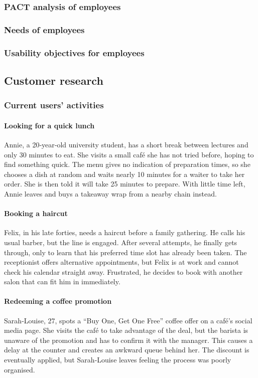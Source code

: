 \documentclass[]{VUMIFTemplateClass}
\newcommand{\subsubsubsection}[1]{\paragraph{#1}}
\begin{document}
\subsubsection{PACT analysis of employees}

\subsubsection{Needs of employees}

\subsubsection{Usability objectives for employees}

\subsection{Customer research}

\subsubsection{Current users' activities}

\subsubsubsection{Looking for a quick lunch}


Annie, a 20‑year‑old university student, has a short break between lectures and
only 30 minutes to eat. She visits a small café she has not tried before, hoping
to find something quick. The menu gives no indication of preparation times, so
she chooses a dish at random and waits nearly 10 minutes for a waiter to take
her order. She is then told it will take 25 minutes to prepare. With little time
left, Annie leaves and buys a takeaway wrap from a nearby chain instead.

\newpage

\subsubsubsection{Booking a haircut}


Felix, in his late forties, needs a haircut before a family gathering. He calls
his usual barber, but the line is engaged. After several attempts, he finally
gets through, only to learn that his preferred time slot has already been taken.
The receptionist offers alternative appointments, but Felix is at work and
cannot check his calendar straight away. Frustrated, he decides to book with
another salon that can fit him in immediately.

\subsubsubsection{Redeeming a coffee promotion}


Sarah‑Louise, 27, spots a “Buy One, Get One Free” coffee offer on a café’s
social media page. She visits the café to take advantage of the deal, but the
barista is unaware of the promotion and has to confirm it with the manager. This
causes a delay at the counter and creates an awkward queue behind  her. The
discount is eventually applied, but Sarah‑Louise leaves feeling the process was
poorly organised.
\end{document}
